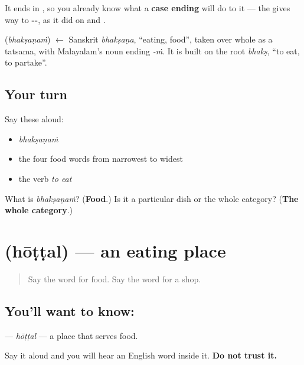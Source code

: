 It ends in \textbf{}, so you already know what a \textbf{case ending} will do to it — the \textbf{} gives way to \textbf{--}, as it did on \textbf{} and \textbf{}.

\begin{cousinweb}
\textbf{} (\emph{bhakṣaṇaṁ}) $\leftarrow$ Sanskrit \emph{bhakṣaṇa}, \textquotedblleft{}eating, food\textquotedblright{}, taken over whole as a tatsama, with Malayalam's noun ending \emph{-ṁ}. It is built on the root \emph{bhakṣ}, \textquotedblleft{}to eat, to partake\textquotedblright{}.
\end{cousinweb}

\subsection*{Your turn}
Say these aloud:

\begin{itemize}
\raggedright
  \item \emph{bhakṣaṇaṁ}
  \item the four food words from narrowest to widest
  \item the verb \emph{to eat}
\end{itemize}

\begin{tcolorbox}[breakable,colback=teal!4,colframe=teal!35!black,title={Before you move on}]
What is \emph{bhakṣaṇaṁ}? (\textbf{Food}.) Is it a particular dish or the whole category? (\textbf{The whole category}.)
\end{tcolorbox}
\section[\texorpdfstring{\ml{ഹോട്ടൽ} (hōṭṭal)}{ഹോട്ടൽ (hōṭṭal)}]{ (hōṭṭal) — an eating place}

\label{lesson:ML-C92-hottal}



\begin{quote}
Say the word for food. Say the word for a shop.
\end{quote}

\subsection*{You'll want to know: }
\textbf{} — \emph{hōṭṭal} — a place that serves food.

Say it aloud and you will hear an English word inside it. \textbf{Do not trust it.}

